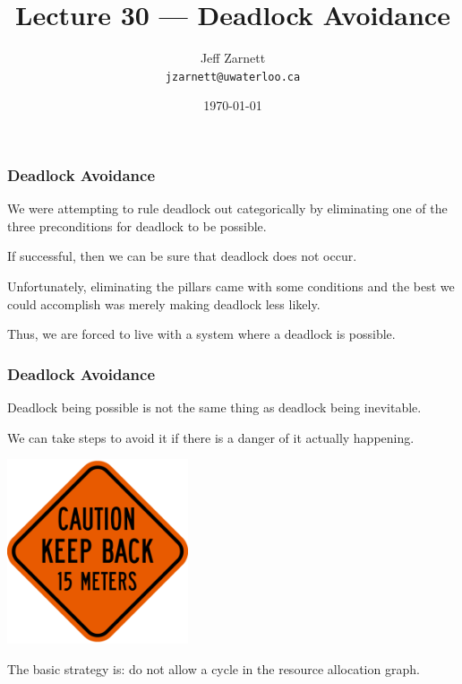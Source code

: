 

\title{Lecture 30 --- Deadlock Avoidance }

\author{Jeff Zarnett \\ \small \texttt{jzarnett@uwaterloo.ca}}
\date{\today}




\begin{frame}
	\titlepage

\end{frame}

\begin{frame}
	\frametitle{Deadlock Avoidance}

	We were attempting to rule deadlock out categorically by eliminating one of the three preconditions for deadlock to be possible.

	If successful, then we can be sure that deadlock does not occur.

	Unfortunately, eliminating the pillars came with some conditions and the best we could accomplish was merely making deadlock less likely.

	Thus, we are forced to live with a system where a deadlock is possible.
\end{frame}


\begin{frame}
	\frametitle{Deadlock Avoidance}

	Deadlock being possible is not the same thing as deadlock being inevitable.

	We can take steps to avoid it if there is a danger of it actually happening.

	\begin{center}
		\includegraphics[width=0.4\textwidth]{images/keepback.png}
	\end{center}

	The basic strategy is: do not allow a cycle in the resource allocation graph.


\end{frame}

